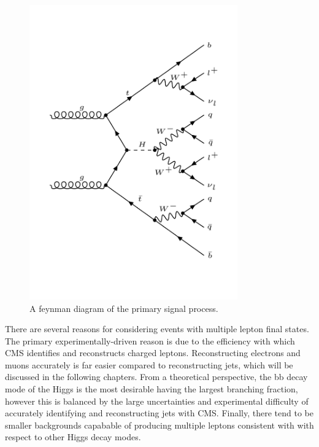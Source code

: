 \begin{figure}[hbtp]
 \begin{center}
   \includegraphics[width=0.8\textwidth]{ch1_figs/feynman_diagram_ttH_HWW_2lss.pdf}
   \caption{A feynman diagram of the primary signal process.}
   \label{fig:intro_feyn}
 \end{center}
\end{figure}

There are several reasons for considering \tth events with multiple lepton final states. The primary experimentally-driven reason is due to the efficiency with which
CMS identifies and reconstructs charged leptons. Reconstructing electrons and muons accurately is far easier compared to reconstructing jets,
which will be discussed in the following chapters. 
From a theoretical perspective, the bb decay mode of the Higgs is the most desirable having the largest branching fraction, however this is balanced by the large
uncertainties and experimental difficulty of accurately identifying and reconstructing jets with CMS.
Finally, there tend to be smaller backgrounds capabable of producing multiple leptons consistent with \tth with respect to other Higgs decay modes. 


